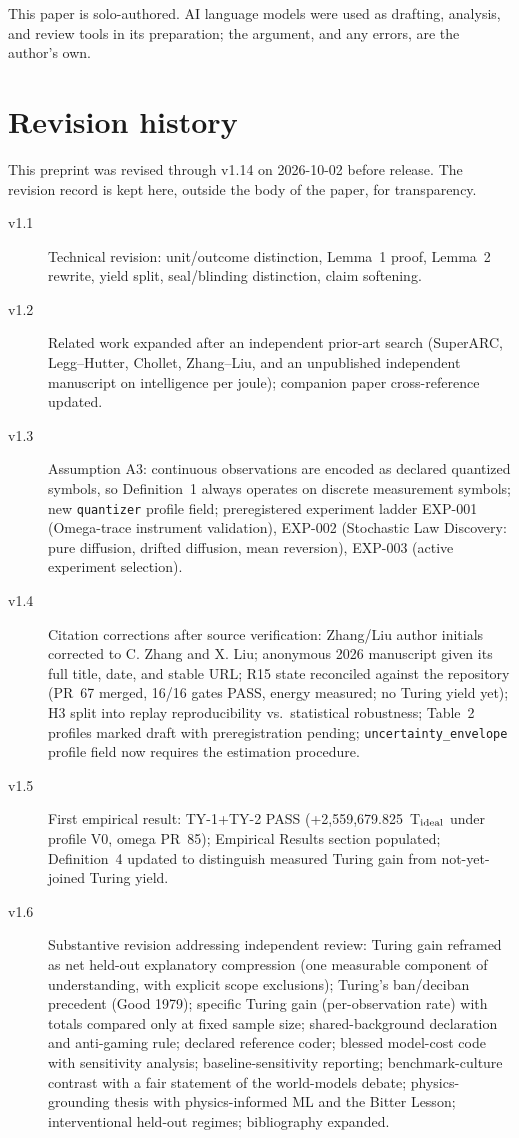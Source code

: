 \documentclass[11pt]{article}
\begin{document}
This paper is solo-authored. AI language models were used as drafting, analysis, and review tools in its preparation; the argument, and any errors, are the author's own.

\appendix
\section{Revision history}

This preprint was revised through v1.14 on 2026-10-02 before release. The revision record is kept here, outside the body of the paper, for transparency.

\begin{description}
\item[v1.1] Technical revision: unit/outcome distinction, Lemma~1 proof, Lemma~2 rewrite, yield split, seal/blinding distinction, claim softening.
\item[v1.2] Related work expanded after an independent prior-art search (SuperARC, Legg--Hutter, Chollet, Zhang--Liu, and an unpublished independent manuscript on intelligence per joule); companion paper cross-reference updated.
\item[v1.3] Assumption A3: continuous observations are encoded as declared quantized symbols, so Definition~1 always operates on discrete measurement symbols; new \texttt{quantizer} profile field; preregistered experiment ladder EXP-001 (Omega-trace instrument validation), EXP-002 (Stochastic Law Discovery: pure diffusion, drifted diffusion, mean reversion), EXP-003 (active experiment selection).
\item[v1.4] Citation corrections after source verification: Zhang/Liu author initials corrected to C. Zhang and X. Liu; anonymous 2026 manuscript given its full title, date, and stable URL; R15 state reconciled against the repository (PR~67 merged, 16/16 gates PASS, energy measured; no Turing yield yet); H3 split into replay reproducibility vs.\ statistical robustness; Table~2 profiles marked draft with preregistration pending; \texttt{uncertainty\_envelope} profile field now requires the estimation procedure.
\item[v1.5] First empirical result: TY-1+TY-2 PASS (+2,559,679.825~T\(_{\rm ideal}\) under profile V0, omega PR~85); Empirical Results section populated; Definition~4 updated to distinguish measured Turing gain from not-yet-joined Turing yield.
\item[v1.6] Substantive revision addressing independent review: Turing gain reframed as net held-out explanatory compression (one measurable component of understanding, with explicit scope exclusions); Turing's ban/deciban precedent (Good 1979); specific Turing gain (per-observation rate) with totals compared only at fixed sample size; shared-background declaration and anti-gaming rule; declared reference coder; blessed model-cost code with sensitivity analysis; baseline-sensitivity reporting; benchmark-culture contrast with a fair statement of the world-models debate; physics-grounding thesis with physics-informed ML and the Bitter Lesson; interventional held-out regimes; bibliography expanded.

\end{description}
\end{document}
